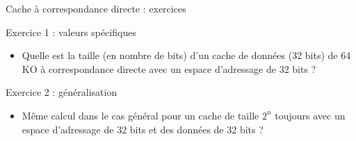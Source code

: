 %
\begin{Frame}{Cache à correspondance directe : exercices}
      \begin{block}{Exercice 1 : valeurs spécifiques}
        \begin{itemize}
        \item Quelle est la taille (en nombre de bits) d'un cache de données (32 bits) de 64 KO à correspondance directe avec un espace d'adressage de 32 bits ?
        \end{itemize}
      \end{block} 

\begin{block}{Exercice 2 : généralisation}
        \begin{itemize}
        \item Même calcul dans le cas général pour un cache de taille $2^{n}$ toujours avec un espace d'adressage de 32 bits et des données de 32 bits ?
        \end{itemize}
      \end{block} 
      
\end{Frame}


